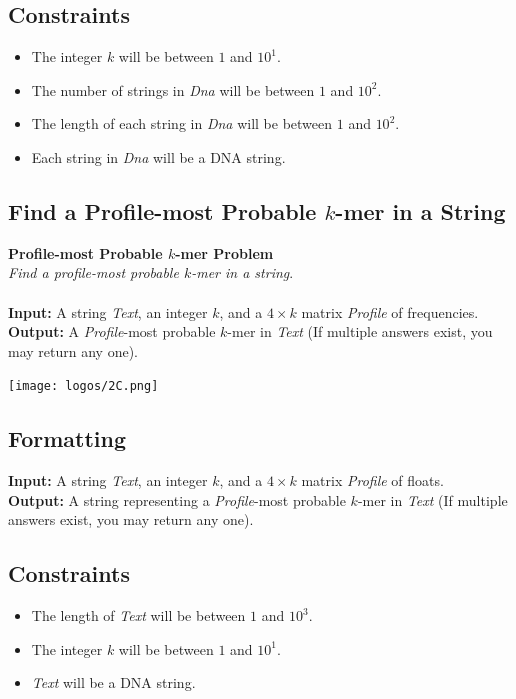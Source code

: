 \documentclass{article}
\begin{document}
\subsection*{Constraints}
\begin{itemize}
    \item The integer $k$ will be between $1$ and $10^1$.
    \item The number of strings in \emph{Dna} will be between $1$ and $10^2$.
    \item The length of each string in \emph{Dna} will be between $1$ and $10^2$.
    \item Each string in \emph{Dna} will be a DNA string.
\end{itemize}
\pagebreak
\subsection{Find a Profile-most Probable $k$-mer in a String}
\hline\vspace{5}
\noindent\textbf{Profile-most Probable $k$-mer Problem}\\
\emph{Find a profile-most probable $k$-mer in a string}.\\ \\
\textbf{Input:} A string \emph{Text}, an integer $k$, and a $4\times k$ matrix \emph{Profile} of frequencies.\\
\textbf{Output:} A \emph{Profile}-most probable $k$-mer in \emph{Text} (If multiple answers exist, you may return any one).
\begin{center}
    \texttt{[image: logos/2C.png]} 
\end{center}
\hline\vspace{5}

\subsection*{Formatting}
\textbf{Input:} A string \emph{Text}, an integer $k$, and a $4\times k$ matrix \emph{Profile} of floats.\\
\noindent\textbf{Output:} A string representing a \emph{Profile}-most probable $k$-mer in \emph{Text} (If multiple answers exist, you may return any one).

\subsection*{Constraints}
\begin{itemize}
    \item The length of \emph{Text} will be between $1$ and $10^3$.
    \item The integer $k$ will be between $1$ and $10^1$.
    \item \emph{Text} will be a DNA string.
\end{itemize}
\pagebreak
\end{document}
